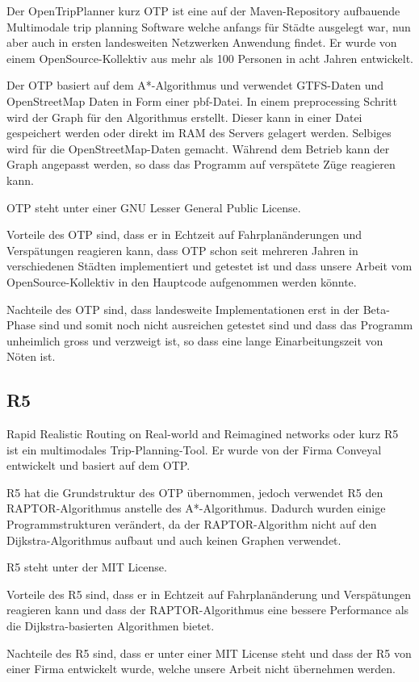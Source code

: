Der OpenTripPlanner kurz OTP ist eine auf der Maven-Repository aufbauende Multimodale trip planning Software welche anfangs für Städte ausgelegt war, nun aber auch in ersten landesweiten Netzwerken Anwendung findet. Er wurde von einem OpenSource-Kollektiv aus mehr als 100 Personen in acht Jahren entwickelt. 

Der OTP basiert auf dem A*-Algorithmus und verwendet GTFS-Daten und OpenStreetMap Daten in Form einer pbf-Datei. In einem preprocessing Schritt wird der Graph für den Algorithmus erstellt. Dieser kann in einer Datei gespeichert werden oder direkt im RAM des Servers gelagert werden. Selbiges wird für die OpenStreetMap-Daten gemacht. Während dem Betrieb kann der Graph angepasst werden, so dass das Programm auf verspätete Züge reagieren kann. 

OTP steht unter einer GNU Lesser General Public License. 

Vorteile des OTP sind, dass er in Echtzeit auf Fahrplanänderungen und Verspätungen reagieren kann, dass OTP schon seit mehreren Jahren in verschiedenen Städten implementiert und getestet ist und dass unsere Arbeit vom OpenSource-Kollektiv in den Hauptcode aufgenommen werden könnte. 

Nachteile des OTP sind, dass landesweite Implementationen erst in der Beta-Phase sind und somit noch nicht ausreichen getestet sind und dass das Programm unheimlich gross und verzweigt ist, so dass eine lange Einarbeitungszeit von Nöten ist.



\subsection{R5}
\label{sec:R5}

Rapid Realistic Routing on Real-world and Reimagined networks oder kurz R5 ist ein multimodales Trip-Planning-Tool. Er wurde von der Firma Conveyal entwickelt und basiert auf dem OTP. 

R5 hat die Grundstruktur des OTP übernommen, jedoch verwendet R5 den RAPTOR-Algorithmus anstelle des A*-Algorithmus. Dadurch wurden einige Programmstrukturen verändert, da der RAPTOR-Algorithm nicht auf den Dijkstra-Algorithmus aufbaut und auch keinen Graphen verwendet. 

R5 steht unter der MIT License. 

Vorteile des R5 sind, dass er in Echtzeit auf Fahrplanänderung und Verspätungen reagieren kann und dass der RAPTOR-Algorithmus eine bessere Performance als die Dijkstra-basierten Algorithmen bietet. 

Nachteile des R5 sind, dass er unter einer MIT License steht und dass der R5 von einer Firma entwickelt wurde, welche unsere Arbeit nicht übernehmen werden.
